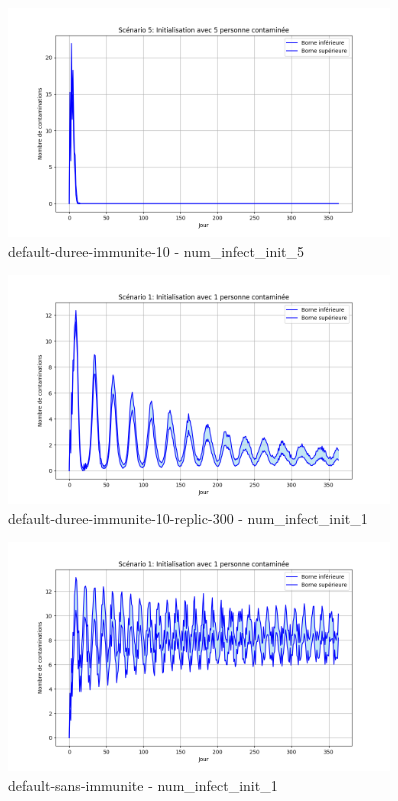 \documentclass[12pt,french,titlepage]{article}
\begin{document}
\begin{figure}[H]
    \centering
    \includegraphics[width=0.9\textwidth]{graphiques/default-duree-immunite-10/num_infect_init_5.png}
    \caption{default-duree-immunite-10 - num\_infect\_init\_5}
    \label{fig:default-duree-immunite-10-num_infect_init_5}
\end{figure}

\begin{figure}[H]
    \centering
    \includegraphics[width=0.9\textwidth]{graphiques/default-duree-immunite-10-replic-300/num_infect_init_1.png}
    \caption{default-duree-immunite-10-replic-300 - num\_infect\_init\_1}
    \label{fig:default-duree-immunite-10-replic-300-num_infect_init_1}
\end{figure}

\begin{figure}[H]
    \centering
    \includegraphics[width=0.9\textwidth]{graphiques/default-sans-immunite/num_infect_init_1.png}
    \caption{default-sans-immunite - num\_infect\_init\_1}
    \label{fig:default-sans-immunite-num_infect_init_1}
\end{figure}
\end{document}
